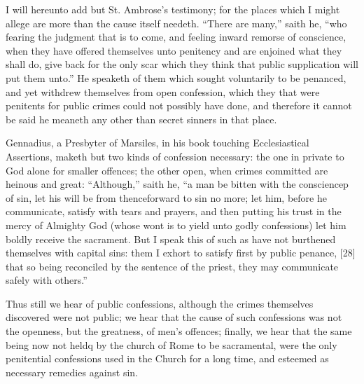 I will hereunto add but St. Ambrose’s testimony; for the places which I might allege are more than the cause itself needeth. “There are many,” saith he, “who fearing the judgment that is to come, and feeling inward remorse of conscience, when they have offered themselves unto penitency and are enjoined what they shall do, give back for the only scar which they think that public supplication will put them unto.” He speaketh of them which sought voluntarily to be penanced, and yet withdrew themselves from open confession, which they that were penitents for public crimes could not possibly have done, and therefore it cannot be said he meaneth any other than secret sinners in that place.

Gennadius, a Presbyter of Marsiles, in his book touching Ecclesiastical Assertions, maketh but two kinds of confession necessary: the one in private to God alone for smaller offences; the other open, when crimes committed are heinous and great: “Although,” saith he, “a man be bitten with the consciencep of sin, let his will be from thenceforward to sin no more; let him, before he communicate, satisfy with tears and prayers, and then putting his trust in the mercy of Almighty God (whose wont is to yield unto godly confessions) let him boldly receive the sacrament. But I speak this of such as have not burthened themselves with capital sins: them I exhort to satisfy first by public penance, [28] that so being reconciled by the sentence of the priest, they may communicate safely with others.”

Thus still we hear of public confessions, although the crimes themselves discovered were not public; we hear that the cause of such confessions was not the openness, but the greatness, of men’s offences; finally, we hear that the same being now not heldq by the church of Rome to be sacramental, were the only penitential confessions used in the Church for a long time, and esteemed as necessary remedies against sin.


